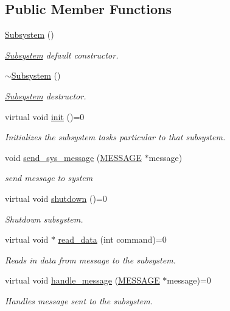 \subsection*{Public Member Functions}
\begin{DoxyCompactItemize}
\item 
\hyperlink{classSubsystem_abdec44abe9ddba76f65abb02f8f62992}{Subsystem} ()
\begin{DoxyCompactList}\small\item\em \hyperlink{classSubsystem}{Subsystem} default constructor. \end{DoxyCompactList}\item 
\hyperlink{classSubsystem_af6026d0c678986cf1626251bf38916fa}{$\sim$\-Subsystem} ()
\begin{DoxyCompactList}\small\item\em \hyperlink{classSubsystem}{Subsystem} destructor. \end{DoxyCompactList}\item 
virtual void \hyperlink{classSubsystem_a77a984e8a06bfebb924a6e7ba4f98363}{init} ()=0
\begin{DoxyCompactList}\small\item\em Initializes the subsystem tasks particular to that subsystem. \end{DoxyCompactList}\item 
void \hyperlink{classSubsystem_a2c33b82253ec4588067349e33247f504}{send\-\_\-sys\-\_\-message} (\hyperlink{SUBSYS__COMMANDS_8h_ad814416fc1a8c675bea2687d96088a8f}{M\-E\-S\-S\-A\-G\-E} $\ast$message)
\begin{DoxyCompactList}\small\item\em send message to system \end{DoxyCompactList}\item 
virtual void \hyperlink{classSubsystem_a510e18f972a3d86d7a47432dafa1ce4c}{shutdown} ()=0
\begin{DoxyCompactList}\small\item\em Shutdown subsystem. \end{DoxyCompactList}\item 
virtual void $\ast$ \hyperlink{classSubsystem_a85307df3e46421814204f77929e893aa}{read\-\_\-data} (int command)=0
\begin{DoxyCompactList}\small\item\em Reads in data from message to the subsystem. \end{DoxyCompactList}\item 
virtual void \hyperlink{classSubsystem_a6205bccfd4906044065d25d8ab1a7bfb}{handle\-\_\-message} (\hyperlink{SUBSYS__COMMANDS_8h_ad814416fc1a8c675bea2687d96088a8f}{M\-E\-S\-S\-A\-G\-E} $\ast$message)=0
\begin{DoxyCompactList}\small\item\em Handles message sent to the subsystem. \end{DoxyCompactList}\end{DoxyCompactItemize}
